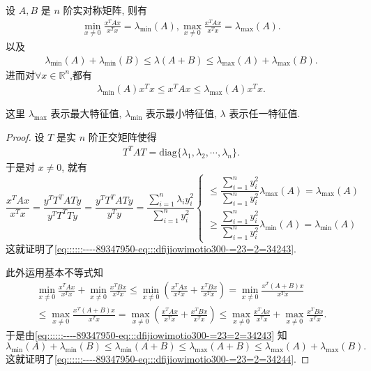 \documentclass[../../main.tex]{subfiles}%
\begin{document}
\begin{proposition}\label{proposition:Rayleigh-quotient瑞丽商的基本性质}
设 \( A, B \) 是 \( n \) 阶实对称矩阵, 则有
\begin{align}
\min_{x \neq 0} \frac{x^T A x}{x^T x} = \lambda_{\min}(A), \max_{x \neq 0} \frac{x^T A x}{x^T x} = \lambda_{\max}(A). \label{eq::::::----89347950-eq:::dfijiowimotio300-=23=2=34243}
\end{align}
以及
\begin{align}
\lambda_{\min}(A) + \lambda_{\min}(B) \leqslant \lambda(A + B) \leqslant \lambda_{\max}(A) + \lambda_{\max}(B). \label{eq::::::----89347950-eq:::dfijiowimotio300-=23=2=34244}
\end{align}
进而对$\forall x\in \mathbb{R}^n$,都有
\begin{align*}
\lambda_{\min}(A)x^Tx \leqslant x^TAx\leqslant \lambda_{\max}(A)x^Tx.
\end{align*}
\end{proposition}
\begin{note}
这里 \( \lambda_{\max} \) 表示最大特征值, \( \lambda_{\min} \) 表示最小特征值, \( \lambda \) 表示任一特征值.
\end{note}
\begin{proof}

设 \( T \) 是实 \( n \) 阶正交矩阵使得
\begin{align*}
T^T A T = \text{diag} \{ \lambda_1, \lambda_2, \cdots, \lambda_n \} .
\end{align*}
于是对 \( x \neq 0 \), 就有
\[
\frac{x^T A x}{x^T x} = \frac{y^T T^T A T y}{y^T T^T T y} = \frac{y^T T^T A T y}{y^T y} = \frac{\sum\limits_{i=1}^n \lambda_i y_i^2}{\sum\limits_{i=1}^n y_i^2}
\begin{cases} 
\leqslant \dfrac{\sum\limits_{i=1}^n y_i^2}{\sum\limits_{i=1}^n y_i^2} \lambda_{\max}(A)=\lambda_{\max}(A)  \\
\geqslant \dfrac{\sum\limits_{i=1}^n y_i^2}{\sum\limits_{i=1}^n y_i^2} \lambda_{\min}(A)=\lambda_{\min}(A)
\end{cases}
\]
这就证明了\eqref{eq::::::----89347950-eq:::dfijiowimotio300-=23=2=34243}.

此外运用基本不等式知
\begin{gather*}
\min_{x\ne 0} \frac{x^TAx}{x^Tx}+\min_{x\ne 0} \frac{x^TBx}{x^Tx}\leqslant \min_{x\ne 0} \left( \frac{x^TAx}{x^Tx}+\frac{x^TBx}{x^Tx} \right) = \min_{x\ne 0} \frac{x^T(A+B)x}{x^Tx}
\\
\leqslant \max_{x\ne 0} \frac{x^T(A+B)x}{x^Tx}= \max_{x\ne 0} \left( \frac{x^TAx}{x^Tx}+\frac{x^TBx}{x^Tx} \right) \leqslant \max_{x\ne 0} \frac{x^TAx}{x^Tx}+\max_{x\ne 0} \frac{x^TBx}{x^Tx}.
\end{gather*}
于是由\eqref{eq::::::----89347950-eq:::dfijiowimotio300-=23=2=34243} 知
\[
\lambda_{\min}(A) + \lambda_{\min}(B) \leqslant \lambda_{\min}(A + B) \leqslant \lambda_{\max}(A + B) \leqslant \lambda_{\max}(A) + \lambda_{\max}(B).
\]
这就证明了\eqref{eq::::::----89347950-eq:::dfijiowimotio300-=23=2=34244}.

\end{proof}
\end{document}
